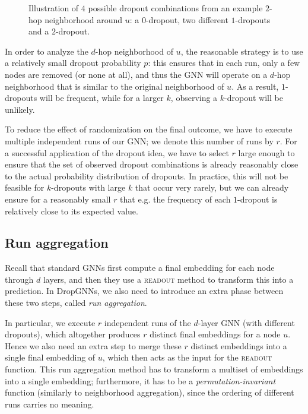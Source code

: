 \documentclass{article}
\begin{document}
\begin{figure}
{ }
\caption{Illustration of $4$ possible dropout combinations from an example $2$-hop neighborhood around $u$: a $0$-dropout, two different $1$-dropouts and a $2$-dropout.}
\label{fig:dropouts}
\end{figure}

In order to analyze the $d$-hop neighborhood of $u$, the reasonable strategy is to use a relatively small dropout probability $p$: this ensures that in each run, only a few nodes are removed (or none at all), and thus the GNN will operate on a $d$-hop neighborhood that is similar to the original neighborhood of $u$. As a result, $1$-dropouts will be frequent, while for a larger $k$, observing a $k$-dropout will be unlikely.

To reduce the effect of randomization on the final outcome, we have to execute multiple independent runs of our GNN; we denote this number of runs by $r$. For a successful application of the dropout idea, we have to select $r$ large enough to ensure that the set of observed dropout combinations is already reasonably close to the actual probability distribution of dropouts. In practice, this will not be feasible for $k$-dropouts with large $k$ that occur very rarely, but we can already ensure for a reasonably small $r$ that e.g. the frequency of each $1$-dropout is relatively close to its expected value.

\subsection{Run aggregation}

Recall that standard GNNs first compute a final embedding for each node through $d$ layers, and then they use a \textsc{readout} method to transform this into a prediction. In DropGNNs, we also need to introduce an extra phase between these two steps, called \textit{run aggregation}.

In particular, we execute $r$ independent runs of the $d$-layer GNN (with different dropouts), which altogether produces $r$ distinct final embeddings for a node $u$. Hence we also need an extra step to merge these $r$ distinct embeddings into a single final embedding of $u$, which then acts as the input for the \textsc{readout} function. This run aggregation method has to transform a multiset of embeddings into a single embedding; furthermore, it has to be a \textit{permutation-invariant} function (similarly to neighborhood aggregation), since the ordering of different runs carries no meaning.
\end{document}
